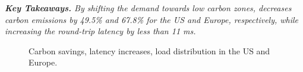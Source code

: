 \noindent \textit{\textbf{Key Takeaways.} 
By shifting the demand towards low carbon zones, \proposedsystem decreases carbon emissions by 49.5\% and 67.8\% for the US and Europe, respectively, while increasing the round-trip latency by less than 11 ms.
}

\begin{figure}[tb]

    \caption{Carbon savings, latency increases, load distribution in the US and Europe.}
    \label{fig:large_scale}
\end{figure}






